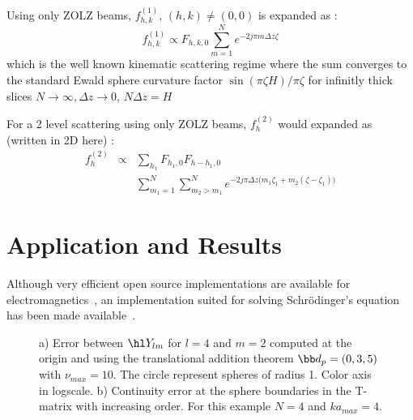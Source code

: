 Using only ZOLZ beams, $f_{h,k}^{(1)}$, $(h,k)\neq (0,0)$ is expanded as :
\begin{equation}\label{eq:MSkin}
  f_{h,k}^{(1)} \propto F_{h,k,0}\sum_{m=1}^N e^{-2j\pi m\Delta z\zeta}
\end{equation}
%
which is the well known kinematic scattering regime where the sum converges to
the standard Ewald sphere curvature factor $\sin(\pi\zeta H)/\pi\zeta$ for
infinitly thick slices $N\rightarrow\infty,\Delta z\rightarrow 0$, $N\Delta z=H$


For a 2 level scattering using only ZOLZ beams,
$f_h^{(2)}$ would expanded as (written in 2D here) :
%
\begin{eqnarray}
  f_h^{(2)} &\propto&\sum_{h_1}F_{h_1,0}F_{h-h_1,0} \nonumber\\
    && \sum_{m_1=1}^N\sum_{m_2>m_1}^N e^{-2j\pi\Delta z
      \bigl(m_1\zeta_1+m_2\left(\zeta-\zeta_1\right)\bigr)} \label{eq:MSdual}
\end{eqnarray}
%









\section{Application and Results}

Although very efficient open source implementations are available for
electromagnetics~\cite{celes2017,pygmm2020}, an implementation suited for
solving Schr{\"o}dinger's equation has been made available~\cite{pyscat}.

\begin{figure}[h!]
  \centering
\caption{
a) Error between $\hl Y_{lm}$ for $l=4$ and $m=2$ computed at the origin and
using the translational addition theorem $\bb d_p = (0,3,5)$ with $\nu_{max}=10$.
The circle represent spheres of radius 1. Color axis in logscale.
b) Continuity error at the sphere boundaries in the T-matrix with increasing
order. For this example $N=4$ and $ka_{max}=4$.
}\label{fig:TmatrixError}
\end{figure}

